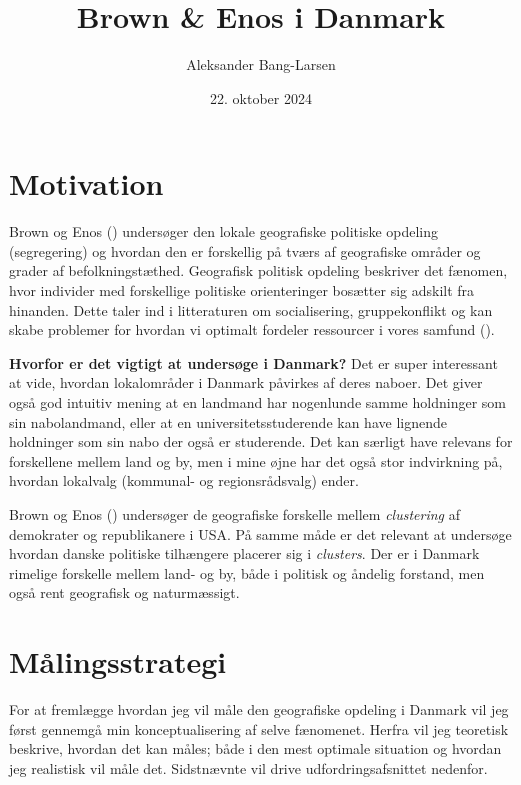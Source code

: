 \documentclass[
  a4paper,
  DIV=11,
  numbers=noendperiod]{scrartcl}
\title{Brown \& Enos i Danmark}
\author{Aleksander Bang-Larsen}
\date{22. oktober 2024}
\begin{document}
\maketitle


\section{Motivation}\label{motivation}

Brown og Enos () undersøger den lokale
geografiske politiske opdeling (segregering) og hvordan den er
forskellig på tværs af geografiske områder og grader af
befolkningstæthed. Geografisk politisk opdeling beskriver det fænomen,
hvor individer med forskellige politiske orienteringer bosætter sig
adskilt fra hinanden. Dette taler ind i litteraturen om socialisering,
gruppekonflikt og kan skabe problemer for hvordan vi optimalt fordeler
ressourcer i vores samfund ().

\textbf{Hvorfor er det vigtigt at undersøge i Danmark?} Det er super
interessant at vide, hvordan lokalområder i Danmark påvirkes af deres
naboer. Det giver også god intuitiv mening at en landmand har nogenlunde
samme holdninger som sin nabolandmand, eller at en
universitetsstuderende kan have lignende holdninger som sin nabo der
også er studerende. Det kan særligt have relevans for forskellene mellem
land og by, men i mine øjne har det også stor indvirkning på, hvordan
lokalvalg (kommunal- og regionsrådsvalg) ender.

Brown og Enos () undersøger de
geografiske forskelle mellem \emph{clustering} af demokrater og
republikanere i USA. På samme måde er det relevant at undersøge hvordan
danske politiske tilhængere placerer sig i \emph{clusters}. Der er i
Danmark rimelige forskelle mellem land- og by, både i politisk og
åndelig forstand, men også rent geografisk og naturmæssigt.

\section{Målingsstrategi}\label{muxe5lingsstrategi}

For at fremlægge hvordan jeg vil måle den geografiske opdeling i Danmark
vil jeg først gennemgå min konceptualisering af selve fænomenet. Herfra
vil jeg teoretisk beskrive, hvordan det kan måles; både i den mest
optimale situation og hvordan jeg realistisk vil måle det. Sidstnævnte
vil drive udfordringsafsnittet nedenfor.
\end{document}
